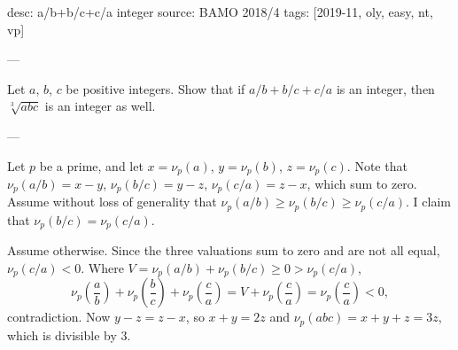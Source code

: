 desc: a/b+b/c+c/a integer
source: BAMO 2018/4
tags: [2019-11, oly, easy, nt, vp]

---

Let $a$, $b$, $c$ be positive integers. Show that if $a/b+b/c+c/a$ is an integer, then $\sqrt[3]{abc}$ is an integer as well.

---

Let $p$ be a prime, and let $x=\nu_p(a)$, $y=\nu_p(b)$, $z=\nu_p(c)$. Note that $\nu_p(a/b)=x-y$, $\nu_p(b/c)=y-z$, $\nu_p(c/a)=z-x$, which sum to zero. Assume without loss of generality that $\nu_p(a/b)\ge\nu_p(b/c)\ge\nu_p(c/a)$. I claim that $\nu_p(b/c)=\nu_p(c/a)$.

Assume otherwise. Since the three valuations sum to zero and are not all equal, $\nu_p(c/a)<0$. Where $V=\nu_p(a/b)+\nu_p(b/c)\ge0>\nu_p(c/a)$, \[\nu_p\left(\frac ab\right)+\nu_p\left(\frac bc\right)+\nu_p\left(\frac ca\right)=V+\nu_p\left(\frac ca\right)=\nu_p\left(\frac ca\right)<0,\]
contradiction. Now $y-z=z-x$, so $x+y=2z$ and $\nu_p(abc)=x+y+z=3z$, which is divisible by $3$.

